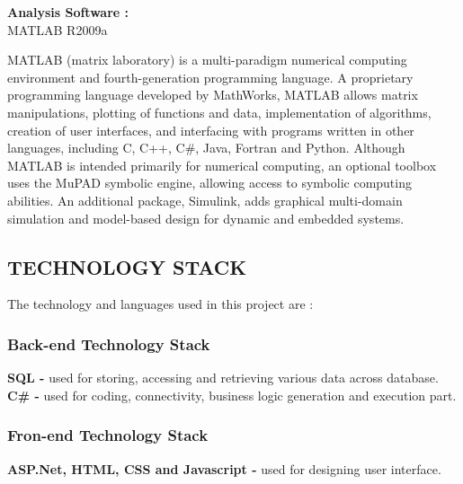 \documentclass[12pt]{article} %
\begin{document}
\textbf{Analysis Software :}\\
\indent MATLAB R2009a\\ \par
MATLAB (matrix laboratory) is a multi-paradigm numerical computing environment and fourth-generation programming language. A proprietary programming language developed by MathWorks, MATLAB allows matrix manipulations, plotting of functions and data, implementation of algorithms, creation of user interfaces, and interfacing with programs written in other languages, including C, C++, C\#, Java, Fortran and Python.
Although MATLAB is intended primarily for numerical computing, an optional toolbox uses the MuPAD symbolic engine, allowing access to symbolic computing abilities. An additional package, Simulink, adds graphical multi-domain simulation and model-based design for dynamic and embedded systems.

 
 \subsection{TECHNOLOGY STACK}
\noindent The technology and languages used in this project are :
\subsubsection{Back-end Technology Stack}
\indent \textbf{SQL - } used for storing, accessing and retrieving various data across database.\\
\indent \textbf{C\# - } used for coding, connectivity, business logic generation and execution part.
\subsubsection{Fron-end Technology Stack}
\indent \textbf{ASP.Net, HTML, CSS and Javascript - } used for designing user interface. 
\end{document}

